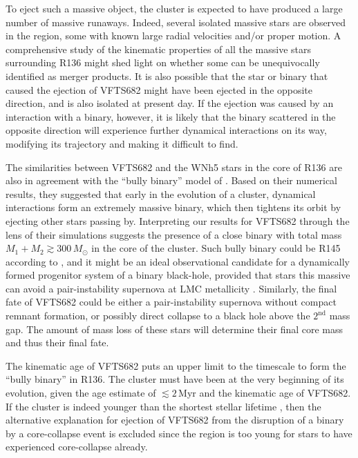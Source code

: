 \documentclass[apjl,twocolumn]{emulateapj}
\DeclareRobustCommand{\Figref}[1]{Fig.~\ref{#1}}
\begin{document}
To eject such a massive object, the cluster is
expected to have produced
a large number of massive runaways. Indeed, several %
isolated massive stars are observed in the region, some with known
large radial velocities and/or proper motion. %
A comprehensive study of the kinematic
properties of all the massive stars surrounding R136 might shed light
on whether some can be unequivocally identified as merger products. It
is also possible that the star or binary that caused the ejection of
VFTS682 might have been ejected in the opposite direction, and is also
isolated at present day. If the ejection was caused by an interaction
with a binary, however, it is likely that the binary scattered in the
opposite direction will experience further dynamical interactions on
its way, modifying its trajectory and making it difficult to find.  %

The similarities between VFTS682 and the WNh5 stars in the core of
R136 are also in agreement with the ``bully binary'' model of
\cite{fujii:11}. Based on their numerical results, they suggested that
early in the evolution of a cluster, dynamical interactions form an extremely
massive binary, which then tightens its orbit by ejecting other stars passing
by. Interpreting our results for VFTS682 through the lens of their simulations
suggests the presence of a close binary with total mass
$M_1+M_2\gtrsim 300\,M_\odot$ in the core of the cluster. Such bully
binary could be R145 according to \cite{fujii:11}, and it might be an
ideal observational candidate for a dynamically formed progenitor system of
a binary black-hole, provided that stars this massive can avoid a
pair-instability supernova \cite[e.g.,][]{rakavy:67} at LMC
metallicity \citep[see also][]{langer:07}. Similarly, the final fate of VFTS682 could be either a
pair-instability supernova without compact remnant formation, or
possibly direct collapse to a black hole above the $2^\mathrm{nd}$
mass gap. The amount of mass loss of these stars will determine their final core
mass and thus their final fate.

The kinematic age of VFTS682 puts an
upper limit to the timescale to form the ``bully binary'' in
R136. The cluster must have been at the very beginning of its
evolution, given the age estimate of $\lesssim 2$\,Myr
\citep[][]{crowther:10,sabbi:12} and the kinematic age of VFTS682. If the
cluster is indeed younger than the shortest stellar lifetime
\citep[$\sim$3\,Myr, e.g.,][]{brott:11, zapartas:17}, then the alternative
explanation for ejection of VFTS682 from the disruption of a binary
by a core-collapse event is excluded since the region is too young for stars
to have experienced core-collapse already.
\end{document}
